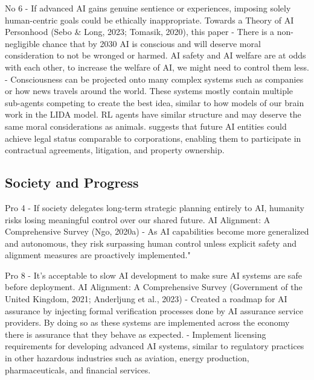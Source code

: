 No 6 - If advanced AI gains genuine sentience or experiences, imposing solely human-centric goals could be ethically inappropriate.
Towards a Theory of AI Personhood
(Sebo \& Long, 2023; Tomasik, 2020), this paper
\citep{sebo_moral_2025} - There is a non-negligible chance that by 2030 AI is conscious and will deserve moral consideration to not be wronged or harmed. AI safety and AI welfare are at odds with each other, to increase the welfare of AI, we might need to control them less.
\citep{tomasik_dialogue_2015} - Consciousness can be projected onto many complex systems such as companies or how news travels around the world. These systems mostly contain multiple sub-agents competing to create the best idea, similar to how models of our brain work in the LIDA model. RL agents have similar structure and may deserve the same moral considerations as animals.
\cite{ward_towards_2025} suggests that future AI entities could achieve legal status comparable to corporations, enabling them to participate in contractual agreements, litigation, and property ownership.


\subsection{Society and Progress}

Pro 4 - If society delegates long-term strategic planning entirely to AI, humanity risks losing meaningful control over our shared future.
AI Alignment: A Comprehensive Survey
(Ngo, 2020a)
\citep{ngo_agi_2020} - As AI capabilities become more generalized and autonomous, they risk surpassing human control unless explicit safety and alignment measures are proactively implemented."

Pro 8 - It's acceptable to slow AI development to make sure AI systems are safe before deployment.
AI Alignment: A Comprehensive Survey
(Government of the United Kingdom, 2021; Anderljung et al., 2023)
\citep{government_of_the_united_kingdom_roadmap_2021} - Created a roadmap for AI assurance by injecting formal verification processes done by AI assurance service providers. By doing so as these systems are implemented across the economy there is assurance that they behave as expected.
\citep{anderljung_frontier_2023} - Implement licensing requirements for developing advanced AI systems, similar to regulatory practices in other hazardous industries such as aviation, energy production, pharmaceuticals, and financial services.


